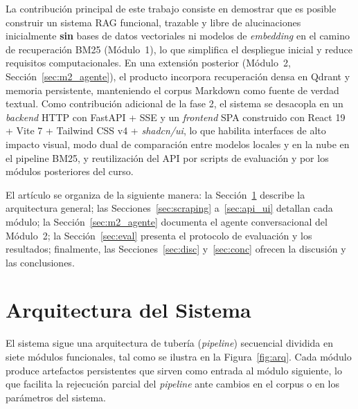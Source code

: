 \documentclass[conference]{IEEEtran}
\begin{document}
La contribución principal de este trabajo consiste en demostrar que es
posible construir un sistema RAG funcional, trazable y libre de alucinaciones
inicialmente \textbf{sin} bases de datos vectoriales ni modelos de
\textit{embedding} en el camino de recuperación BM25 (Módulo~1), lo que
simplifica el despliegue inicial y reduce requisitos computacionales. En una
extensión posterior (Módulo~2, Sección~\ref{sec:m2_agente}), el producto
incorpora recuperación densa en Qdrant y memoria persistente, manteniendo el
corpus Markdown como fuente de verdad textual. Como contribución adicional
de la fase 2, el sistema se desacopla en un \textit{backend} HTTP con
FastAPI + SSE y un \textit{frontend} SPA construido con React 19 + Vite 7 +
Tailwind CSS v4 + \textit{shadcn/ui}, lo que habilita interfaces de alto
impacto visual, modo dual de comparación entre modelos locales y en la nube
en el pipeline BM25, y reutilización del API por scripts de evaluación y por
los módulos posteriores del curso.

El artículo se organiza de la siguiente manera: la Sección~\ref{sec:arq}
describe la arquitectura general; las Secciones~\ref{sec:scraping}
a~\ref{sec:api_ui} detallan cada módulo; la Sección~\ref{sec:m2_agente}
documenta el agente conversacional del Módulo~2; la Sección~\ref{sec:eval}
presenta el protocolo de evaluación y los resultados; finalmente, las
Secciones~\ref{sec:disc} y~\ref{sec:conc} ofrecen la discusión y las
conclusiones.

\section{Arquitectura del Sistema}
\label{sec:arq}

El sistema sigue una arquitectura de tubería (\textit{pipeline}) secuencial
dividida en siete módulos funcionales, tal como se ilustra en la
Figura~\ref{fig:arq}. Cada módulo produce artefactos persistentes que sirven
como entrada al módulo siguiente, lo que facilita la rejecución parcial del
\textit{pipeline} ante cambios en el corpus o en los parámetros del sistema.
\end{document}
